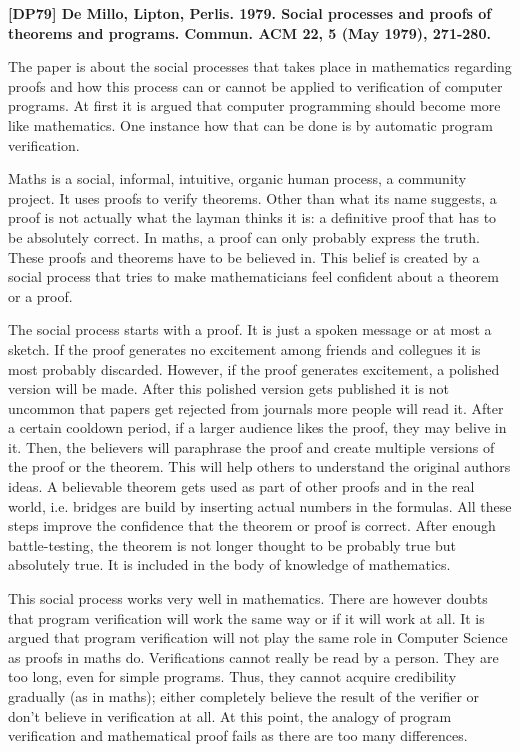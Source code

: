 \documentclass[a4paper,12pt]{scrartcl}
\newcommand{\papertitle}[2]{
	\noindent
	\textbf{\textsf{{\large
		[#1] #2
	}}}
	\vspace{2mm}
}
\begin{document}
\pagestyle{fancy} %

\papertitle{DP79}{De Millo, Lipton, Perlis. 1979. Social processes and proofs of
				  theorems and programs. Commun. ACM 22, 5 (May 1979), 271-280.}

The paper is about the social processes that takes place in mathematics
regarding proofs and how this process can or cannot be applied to verification
of computer programs. At first it is argued that computer programming should
become more like mathematics. One instance how that can be done is by automatic
program verification.

Maths is a social, informal, intuitive, organic human process, a community
project. It uses proofs to verify theorems. Other than what its name suggests,
a proof is not actually what the layman thinks it is: a definitive proof that
has to be absolutely correct. In maths, a proof can only probably express the
truth. These proofs and theorems have to be believed in. This belief is created
by a social process that tries to make mathematicians feel confident about a
theorem	or a proof.

The social process starts with a proof. It is just a spoken message or at most
a sketch. If the proof generates no excitement among friends and collegues it is
most probably discarded. However, if the proof generates excitement, a
polished version will be made. After this polished version gets
published \textemdash{} it is not uncommon that papers get rejected from
journals \textemdash{} more people will read it. After a certain cooldown
period, if a larger audience likes the proof, they may belive in it. Then,
the believers will paraphrase the proof and create multiple versions of the
proof or the theorem. This will help others to understand the original authors
ideas. A believable theorem gets used as part of other proofs and in the real
world, i.e. bridges are build by inserting actual numbers in the formulas. All
these steps improve the confidence that the theorem or proof is correct. After
enough battle-testing, the theorem is not longer thought to be probably true but
absolutely true. It is included in the body of knowledge of mathematics.

This social process works very well in mathematics. There are however doubts
that program verification will work the same way or if it will work at all. It
is argued that program verification will not play the same role in Computer
Science as proofs in maths do. Verifications cannot really be read by a person.
They are too long, even for simple programs. Thus, they cannot acquire
credibility gradually (as in maths); either completely believe the result of the
verifier or don't believe in verification at all. At this point, the analogy of
program verification and mathematical proof fails as there are too many
differences.
\end{document}
